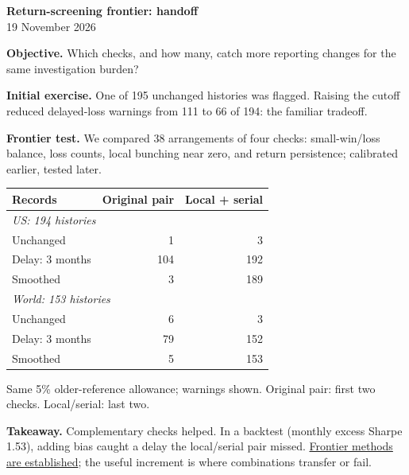 \documentclass[12pt,letterpaper]{article}
\newcommand{\lead}[1]{\textbf{#1}}
\begin{document}
\begin{center}
{\Large\bfseries Return-screening frontier: handoff}\\[5pt]
{19 November 2026}
\end{center}

\lead{Objective.} Which checks, and how many, catch more reporting changes for the same investigation burden?

\lead{Initial exercise.} One of 195 unchanged histories was flagged. Raising the cutoff reduced delayed-loss warnings from 111 to 66 of 194: the familiar tradeoff.

\lead{Frontier test.} We compared 38 arrangements of four checks: small-win/loss balance, loss counts, local bunching near zero, and return persistence; calibrated earlier, tested later.

\begin{center}
\begin{tabular}{lrr}
\toprule
Records & Original pair & Local + serial \\
\midrule
\multicolumn{3}{l}{\textit{US: 194 histories}} \\
Unchanged & 1 & 3 \\
Delay: 3 months & 104 & 192 \\
Smoothed & 3 & 189 \\
\midrule
\multicolumn{3}{l}{\textit{World: 153 histories}} \\
Unchanged & 6 & 3 \\
Delay: 3 months & 79 & 152 \\
Smoothed & 5 & 153 \\
\bottomrule
\end{tabular}
\end{center}
{\small Same 5\% older-reference allowance; warnings shown. Original pair: first two checks. Local/serial: last two.}

\lead{Takeaway.} Complementary checks helped. In a backtest (monthly excess Sharpe 1.53), adding bias caught a delay the local/serial pair missed. \href{https://doi.org/10.1093/rfs/hhs085}{Frontier methods are established}; the useful increment is where combinations transfer or fail.
\end{document}
